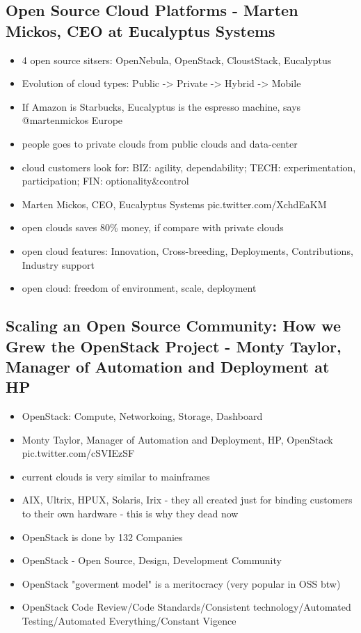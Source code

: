 \documentclass[10pt]{article}
\begin{document}
{\subsection{Open Source Cloud Platforms - Marten Mickos, CEO at Eucalyptus Systems}
\begin{itemize}
\item 4 open source sitsers: OpenNebula, OpenStack, CloustStack, Eucalyptus
\item Evolution of cloud types: Public -> Private -> Hybrid -> Mobile
\item If Amazon is Starbucks, Eucalyptus is the espresso machine, says @martenmickos  Europe
\item people goes to private clouds from public clouds and data-center
\item cloud customers look for: BIZ: agility, dependability; TECH: experimentation, participation; FIN: optionality\&control
\item Marten Mickos, CEO, Eucalyptus Systems pic.twitter.com/XchdEaKM
\item open clouds saves 80\% money, if compare with private clouds
\item open cloud features: Innovation, Cross-breeding, Deployments, Contributions, Industry support
\item open cloud: freedom of environment, scale, deployment
\end{itemize}


\subsection{Scaling an Open Source Community: How we Grew the OpenStack Project - Monty Taylor, Manager of Automation and Deployment at HP}
\begin{itemize}
\item OpenStack: Compute, Networkoing, Storage, Dashboard
\item Monty Taylor, Manager of Automation and Deployment, HP, OpenStack pic.twitter.com/cSVIEzSF
\item current clouds is very similar to mainframes
\item AIX, Ultrix, HPUX, Solaris, Irix - they all created just for binding customers to their own hardware - this is why they dead now
\item OpenStack is done by 132 Companies
\item OpenStack - Open Source, Design, Development Community
\item OpenStack "goverment model" is a meritocracy (very popular in OSS btw)
\item OpenStack Code Review/Code Standards/Consistent technology/Automated Testing/Automated Everything/Constant Vigence
\end{itemize}

}
\end{document}
